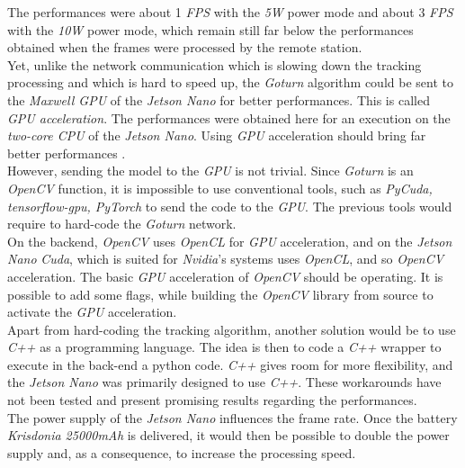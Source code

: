 		The performances were about 1 \textit{FPS} with the \textit{5W} power mode
		and about 3 \textit{FPS} with the \textit{10W} power mode, which 
		remain still far below the performances obtained when the frames 
		were processed by the remote station.
		\\\indent Yet, unlike the network communication which is slowing down 
		the tracking processing and which is hard to speed up, the
		\textit{Goturn} algorithm could be sent to the \textit{Maxwell GPU}
		of the \textit{Jetson Nano} for better performances. 
		This is called \textit{GPU acceleration}. The performances
		were obtained here for an execution on the \textit{two-core CPU} of the 
		\textit{Jetson Nano}. Using \textit{GPU} acceleration should
		bring far better performances \cite{nanotest,installingopencv}.
		\\\indent However, sending the model to the \textit{GPU} is not trivial.
		Since \textit{Goturn} is an \textit{OpenCV} function, it is impossible 
		to use conventional tools, such as \textit{PyCuda, tensorflow-gpu, PyTorch} 
		to send the code to the \textit{GPU}. The previous tools would require 
		to hard-code the \textit{Goturn} network. \cite{nvidiagpupy,}
		\\\indent On the backend, \textit{OpenCV} uses \textit{OpenCL} for \textit{GPU}
		acceleration, and on the \textit{Jetson Nano} \textit{Cuda}, which 
		is suited for \textit{Nvidia}'s systems uses \textit{OpenCL}, and so \textit{OpenCV}
		acceleration. The basic \textit{GPU} acceleration of \textit{OpenCV} should 
		be operating. It is possible to add some flags, while building 
		the \textit{OpenCV} library from source to activate the 
		\textit{GPU} acceleration.\cite{opencl, opencvacceleration, opencvacceleration2, installingopencv}
		\\\indent Apart from hard-coding the tracking algorithm, another solution would
		be to use \textit{C++} as a programming language. The idea is then 
		to code a \textit{C++} wrapper to execute in the back-end a python code.
		\textit{C++} gives room for more flexibility, and the \textit{Jetson Nano}
		was primarily designed to use \textit{C++}. These 
		workarounds have not been tested and present promising results regarding the performances.
		\\\indent The power supply of the \textit{Jetson Nano} 
		influences the frame rate. Once the battery \textit{Krisdonia 25000mAh}
		is delivered, it would then be possible to double the power supply
		and, as a consequence, to increase the processing speed.
		
